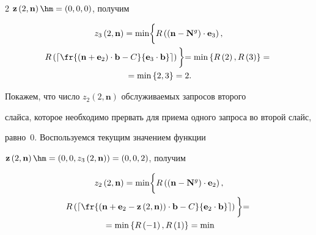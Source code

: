 \begin{multicols}{2}
$\mathbf{z}\left(2,\mathbf{n}\right)\hm=\left(0,0,0\right)$, получим


\begin{multline*}


z_3\left(2,\mathbf{n}\right) = \min


\biggl\{


R \left(\left(\mathbf{n}-\mathbf{N}^{{g}}\right) \cdot \mathbf{e}_3\right), 


\\


R \left(\left\lceil \fr{\left(\mathbf{n}+\mathbf{e}_2 \right)\cdot\mathbf{b} - 


C}{\mathbf{e}_3\cdot\mathbf{b}} \right\rceil\right)


\biggl\} =


\min \left\{ R \left(2\right),R \left(3\right) \right\} ={} \\


{}= \min \left\{2,3\right\} = 2.


\end{multline*}





Покажем, что число $z_2\left(2,\mathbf{n}\right)$ об\-слу\-жи\-ва\-емых запросов второго 


слайса, которое необходимо прервать для приема одного запроса во второй слайс, 


равно~$0$. Воспользуемся текущим значением функции 


$\mathbf{z}\left(2,\mathbf{n}\right)\hm=\left(0,0,z_3\left(2,\mathbf{n}\right)\right)=\left(0,0,2\right)$, получим


\begin{multline*}


z_2\left(2,\mathbf{n}\right) = \min


\biggl\{


R \left(\left(\mathbf{n}-\mathbf{N}^{{g}}\right) \cdot \mathbf{e}_2\right), 


\\


R \left(\left\lceil \fr{\left(\mathbf{n}+\mathbf{e}_2 - 


\mathbf{z}\left(2,\mathbf{n}\right) \right)\cdot\mathbf{b} - 


C}{\mathbf{e}_2\cdot\mathbf{b}} \right\rceil\right)


\biggl\} ={} \\


{}= \min \left\{R \left(-1\right),R \left(1\right) \right\} = \min 



\end{multline*}
\end{multicols}
